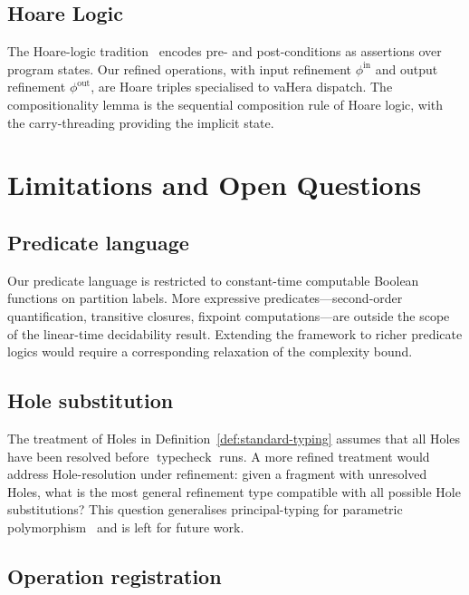 \documentclass[twocolumn,11pt,a4paper]{article}
\DeclareMathOperator{\typecheck}{typecheck}
\begin{document}
\subsection{Hoare Logic}

The Hoare-logic tradition~\citep{hoare1969axiomatic,dijkstra1975guarded} encodes pre- and post-conditions as assertions over program states. Our refined operations, with input refinement $\phi^{\mathrm{in}}$ and output refinement $\phi^{\mathrm{out}}$, are Hoare triples specialised to vaHera dispatch. The compositionality lemma is the sequential composition rule of Hoare logic, with the carry-threading providing the implicit state.

\section{Limitations and Open Questions}
\label{sec:limitations}

\subsection{Predicate language}

Our predicate language is restricted to constant-time computable Boolean functions on partition labels. More expressive predicates---second-order quantification, transitive closures, fixpoint computations---are outside the scope of the linear-time decidability result. Extending the framework to richer predicate logics would require a corresponding relaxation of the complexity bound.

\subsection{Hole substitution}

The treatment of Holes in Definition~\ref{def:standard-typing} assumes that all Holes have been resolved before $\typecheck$ runs. A more refined treatment would address Hole-resolution under refinement: given a fragment with unresolved Holes, what is the most general refinement type compatible with all possible Hole substitutions? This question generalises principal-typing for parametric polymorphism~\citep{milner1978theory,damas1982principal} and is left for future work.

\subsection{Operation registration}
\end{document}

